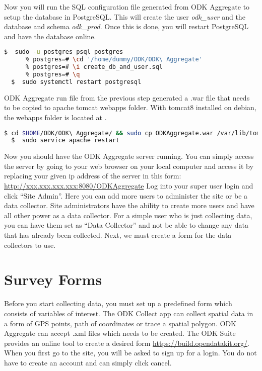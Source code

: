 \noindent
Now you will run the SQL configuration file generated from ODK Aggregate to setup the database in PostgreSQL. This will create the user \emph{odk\_user} and the database and schema \emph{odk\_prod}. Once this is done, you will restart PostgreSQL and have the database online.

\begin{lstlisting}[language=bash]
  $  sudo -u postgres psql postgres
      % postgres=# \cd '/home/dummy/ODK/ODK\ Aggregate'
      % postgres=# \i create_db_and_user.sql
      % postgres=# \q
  $  sudo systemctl restart postgresql
\end{lstlisting}


\noindent
ODK Aggregate run file from the previous step generated a .war file that needs to be copied to apache tomcat webapps folder. With tomcat8 installed on debian, the webapps folder is located at .


\begin{lstlisting}[language=bash]
  $ cd $HOME/ODK/ODK\ Aggregate/ && sudo cp ODKAggregate.war /var/lib/tomcat8/webapps
  $  sudo service apache restart
\end{lstlisting}

\noindent
Now you should have the ODK Aggregate server running. You can simply access the server by going to your web browser on your local computer and access it by replacing your given ip address of the server in this form: \url{http://xxx.xxx.xxx.xxx:8080/ODKAggregate} Log into your super user login and click ``Site Admin''. Here you can add more users to administer the site or be a data collector. Site administrators have the ability to create more users and have all other power as a data collector. For a simple user who is just collecting data, you can have them set as ``Data Collector'' and not be able to change any data that has already been collected. Next, we must create a form for the data collectors to use.


\section*{Survey Forms}

Before you start collecting data, you must set up a predefined form which consists of variables of interest. The ODK Collect app can collect spatial data in a form of GPS points, path of coordinates or trace a spatial polygon. ODK Aggregate can accept .xml files which needs to be created. The ODK Suite provides an online tool to create a desired form \url{https://build.opendatakit.org/}. When you first go to the site, you will be asked to sign up for a login. You do not have to create an account and can simply click cancel.


